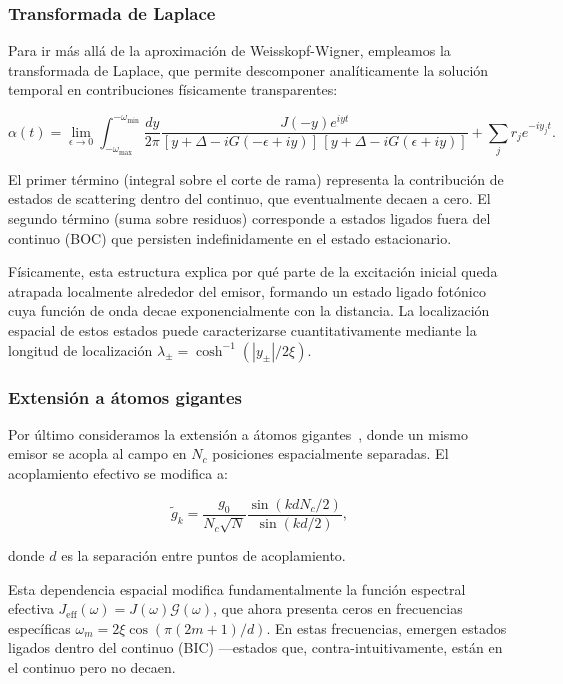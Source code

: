\documentclass[onecolumn,notitlepage,letterpaper,aps,pra,12pt]{article}
\numberwithin{equation}{section}
\begin{document}
\subsubsection{Transformada de Laplace}

Para ir más allá de la aproximación de Weisskopf-Wigner, empleamos la transformada de Laplace, que permite descomponer analíticamente la solución temporal en contribuciones físicamente transparentes:

\[\alpha(t) = \lim_{\epsilon\to 0}\int_{-\omega_{\max}}^{-\omega_{\min}}\frac{dy}{2\pi}\frac{J(-y)e^{iyt}}{[y+\Delta-iG(-\epsilon+iy)]\,[y+\Delta-iG(\epsilon+iy)]} + \sum_{j}r_{j}e^{-iy_{j}t}.\]

El primer término (integral sobre el corte de rama) representa la contribución de estados de scattering dentro del continuo, que eventualmente decaen a cero. El segundo término (suma sobre residuos) corresponde a estados ligados fuera del continuo (BOC) que persisten indefinidamente en el estado estacionario.

Físicamente, esta estructura explica por qué parte de la excitación inicial queda atrapada localmente alrededor del emisor, formando un estado ligado fotónico cuya función de onda decae exponencialmente con la distancia. La localización espacial de estos estados puede caracterizarse cuantitativamente mediante la longitud de localización $\lambda_{\pm} = \cosh^{-1} (|y_{\pm}|/2\xi)$.

\subsubsection{Extensión a átomos gigantes}

Por último consideramos la extensión a átomos gigantes~\cite{gonzalez2025}, donde un mismo emisor se acopla al campo en $N_c$ posiciones espacialmente separadas. El acoplamiento efectivo se modifica a:

\[\tilde{g}_k = \frac{g_0}{N_c\sqrt{N}} \frac{\sin(kdN_c/2)}{\sin(kd/2)},\]

donde $d$ es la separación entre puntos de acoplamiento.

Esta dependencia espacial modifica fundamentalmente la función espectral efectiva $J_{\text{eff}}(\omega) = J(\omega) \mathcal{G}(\omega)$, que ahora presenta ceros en frecuencias específicas $\omega_m = 2\xi\cos(\pi(2m+1)/d)$. En estas frecuencias, emergen estados ligados dentro del continuo (BIC) —estados que, contra-intuitivamente, están en el continuo pero no decaen.
\end{document}
